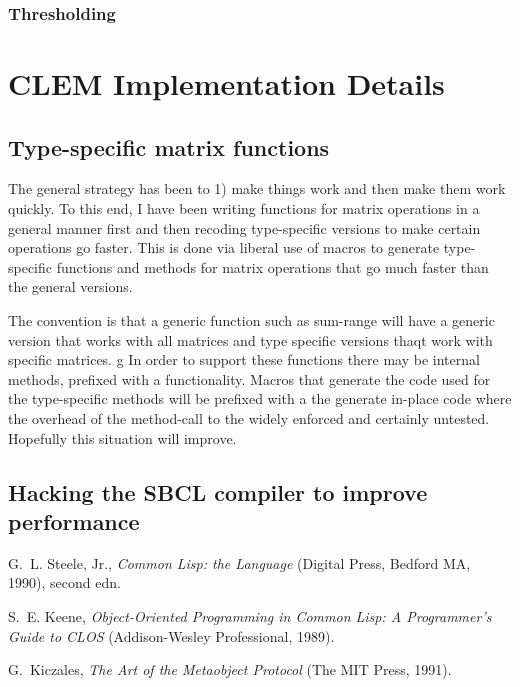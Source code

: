 \documentclass[10pt]{article}
\begin{document}
\subsubsection{Thresholding}
\baselineskip14pt
\clearpage
\section{CLEM Implementation Details}
\baselineskip12pt
\subsection{Type-specific matrix functions}
\baselineskip14pt
The general strategy has been to 1) make things work and
 then make them work quickly.  To this end, I have been writing
 functions for matrix operations in a general manner first and
 then recoding type-specific versions to make certain operations
 go faster.  This is done via liberal use of macros to generate
 type-specific functions and methods for matrix operations that
 go much faster than the general versions.

The convention is that a generic function such as sum-range
 will have a generic version that works with all matrices and
 type specific versions thaqt work with specific matrices. g In
 order to support these functions there may be internal methods,
 prefixed with a %
 functionality.  Macros that generate the code used for the
 type-specific methods will be prefixed with a %
 the %
 generate in-place code where the overhead of the method-call to
 the %
 widely enforced and certainly untested. Hopefully this situation
 will improve.

\baselineskip12pt
\subsection{Hacking the SBCL compiler to improve performance}
\baselineskip14pt
\clearpage
\baselineskip11pt
\begin{thebibliography}{1}

G.~L. Steele, Jr., {\it Common {L}isp: the {L}anguage\/} (Digital Press, Bedford MA, 1990), second edn.

S.~E. Keene, {\it Object-{O}riented {P}rogramming in {C}ommon {L}isp: {A} {P}rogrammer's 	{G}uide to {CLOS}\/} (Addison-Wesley Professional, 1989).

G.~Kiczales, {\it The {A}rt of the {M}etaobject {P}rotocol\/} (The MIT Press, 1991).

\end{thebibliography}
\end{document}
